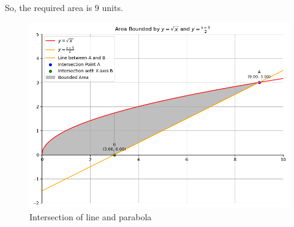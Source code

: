 \documentclass[journal]{IEEEtran}
\begin{document}
{So, the required area is $9$ units.
   \begin{figure}[!ht]
    \centering
	\includegraphics[width=1\textwidth]{plots/plot.png}
    \caption{Intersection of line and parabola}
    \label{fig:plot}
\end{figure}  

}
\end{document}
